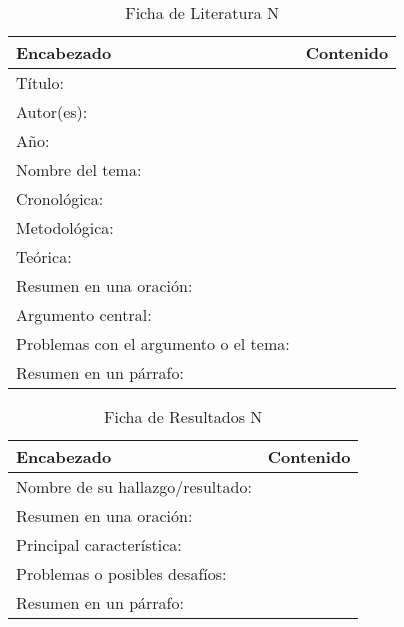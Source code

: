 \begin{table}[H]
    \caption{Ficha de Literatura N}
    \begin{center}
        \begin{tabular}{  m{3cm} | m{12cm}  }
        \hline
        \textbf{ Encabezado} & \textbf{Contenido }\\ 
        \hline
        Título: &  \\ 
        \hline
        Autor(es): &  \\
        \hline
        Año: &  \\ 
        \hline
        Nombre del tema: &  \\ 
        \hline
        Cronológica: &   \\ 
        \hline
        Metodológica: &  \\  
        \hline
        Teórica: &  \\ 
        \hline
        Resumen en una oración: &  \\ 
        \hline
        Argumento central: &   \\ 
        \hline
        Problemas con el argumento o el tema: &  \\ 
        \hline
        Resumen en un párrafo: & \\ 
        \hline
        \end{tabular}
    \end{center}
\end{table}

\begin{table}[H]
    \caption{Ficha de Resultados N}
    \begin{center}
        \begin{tabular}{  m{3cm} | m{12cm}  }
        \hline
        \textbf{ Encabezado} & \textbf{Contenido }\\ 
        \hline
        Nombre de su hallazgo/resultado: & \\ 
        \hline
        Resumen en una oración: & \\ 
        \hline
        Principal característica: & \\ 
        \hline
        Problemas o posibles desafíos: & \\ 
        \hline
        Resumen en un párrafo: & \\ 
        \hline
        \end{tabular}
    \end{center}
\end{table}